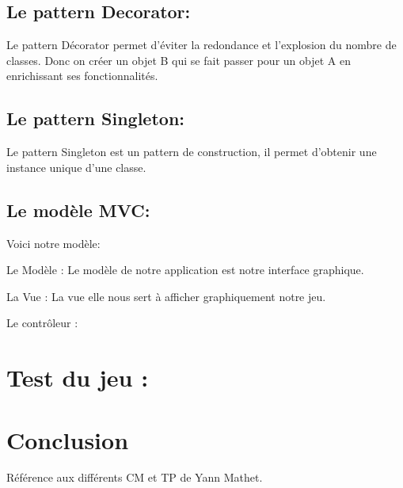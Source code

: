 \documentclass{article}
\begin{document}
\subsection{Le pattern Decorator:}

Le pattern Décorator permet d'éviter la redondance et l'explosion du nombre de classes. Donc on créer un objet B qui se fait passer pour un objet A en enrichissant ses fonctionnalités.

\subsection{Le pattern Singleton:}

Le pattern Singleton est un pattern de construction, il permet d'obtenir une instance unique d'une classe.

\subsection{Le modèle MVC:}

Voici notre modèle:

\vspace{1\baselineskip}

Le Modèle : Le modèle de notre application est notre interface graphique.

La Vue : La vue elle nous sert à afficher graphiquement notre jeu.

Le contrôleur :


\section{Test du jeu :}

\section{Conclusion}







\vspace{1\baselineskip}

Référence aux différents CM et TP de Yann Mathet.
\end{document}
